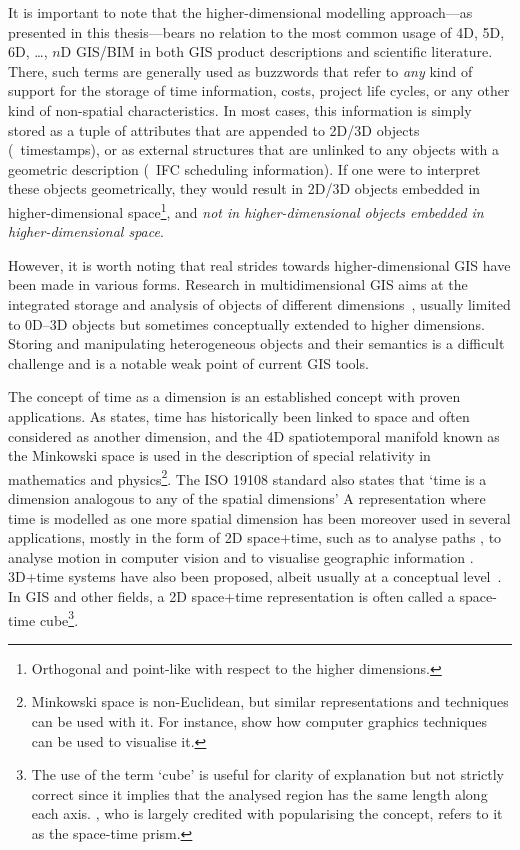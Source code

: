 
It is important to note that the higher-dimensional modelling approach---as presented in this thesis---bears no relation to the most common usage of 4D, 5D, 6D, \ldots, $n$D GIS/BIM in both GIS product descriptions and scientific literature.
There, such terms are generally used as buzzwords that refer to \emph{any} kind of support for the storage of time information, costs, project life cycles, or any other kind of non-spatial characteristics.
In most cases, this information is simply stored as a tuple of attributes that are appended to 2D/3D objects (\eg\ timestamps), or as external structures that are unlinked to any objects with a geometric description (\eg\ IFC scheduling information).
If one were to interpret these objects geometrically, they would result in 2D/3D objects embedded in higher-dimensional space\footnote{Orthogonal and point-like with respect to the higher dimensions.}, and \emph{not in higher-dimensional objects embedded in higher-dimensional space}.


However, it is worth noting that real strides towards higher-dimensional GIS have been made in various forms.
Research in multidimensional GIS aims at the integrated storage and analysis of objects of different dimensions~\citep{Raper00,Gold05}, usually limited to 0D--3D objects but sometimes conceptually extended to higher dimensions.
Storing and manipulating heterogeneous objects and their semantics is a difficult challenge and is a notable weak point of current GIS tools.


The concept of time as a dimension is an established concept with proven applications.
As \citet{Couclelis99} states, time has historically been linked to space and often considered as another dimension, and the 4D spatiotemporal manifold known as the Minkowski space \citep{Minkowski08} is used in the description of special relativity in mathematics and physics\footnote{Minkowski space is non-Euclidean, but similar representations and techniques can be used with it. For instance, \citet{Hanson01} show how computer graphics techniques can be used to visualise it.}.
The ISO 19108 standard also states that `time is a dimension analogous to any of the spatial dimensions' \citep{ISO19108:2002}
A representation where time is modelled as one more spatial dimension has been moreover used in several applications, mostly in the form of 2D space+time, such as to analyse paths \citep{Hagerstrand70}, to analyse motion in computer vision \citep{Basri05} and to visualise geographic information \citep{Kraak03}.
3D+time systems have also been proposed, albeit usually at a conceptual level~\citep{Galton04}.
In GIS and other fields, a 2D space+time representation is often called a space-time cube\footnote{The use of the term `cube' is useful for clarity of explanation but not strictly correct since it implies that the analysed region has the same length along each axis. \citet{Hagerstrand70}, who is largely credited with popularising the concept, refers to it as the space-time prism.}.

